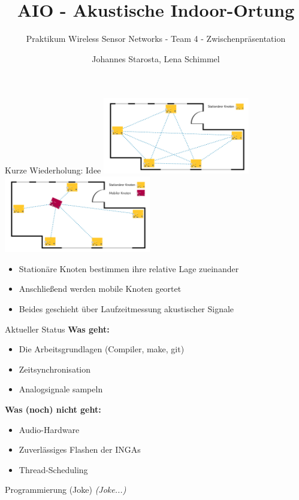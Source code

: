 \documentclass[fleqn,11pt]{beamer}
\title{AIO - Akustische Indoor-Ortung}
\subtitle{Praktikum Wireless Sensor Networks - Team 4 - Zwischenpräsentation}
\author{Johannes Starosta, Lena Schimmel}
\begin{document}
\begin{frame}[plain]
\titlepage
\end{frame}

\begin{frame}{Kurze Wiederholung: Idee}
	\includegraphics[width=0.48\textwidth]{room-2.pdf}
	\includegraphics[width=0.48\textwidth]{room-3.pdf}

	\begin{itemize}
		\item Stationäre Knoten bestimmen ihre relative Lage zueinander
		\item Anschließend werden mobile Knoten geortet
		\item Beides geschieht über Laufzeitmessung akustischer Signale
	\end{itemize}
\end{frame}

\begin{frame}{Aktueller Status}
	\textbf{Was geht:}
	\begin{itemize}
		\item Die Arbeitsgrundlagen (Compiler, make, git)
		\item Zeitsynchronisation
		\item Analogsignale sampeln
	\end{itemize}
	
	\textbf{Was (noch) nicht geht:}
	\begin{itemize}
		\item Audio-Hardware
		\item Zuverlässiges Flashen der INGAs
		\item Thread-Scheduling
	\end{itemize}
\end{frame}

\begin{frame}{Programmierung (Joke)}
	\textit{(Joke...)}
\end{frame}
\end{document}
